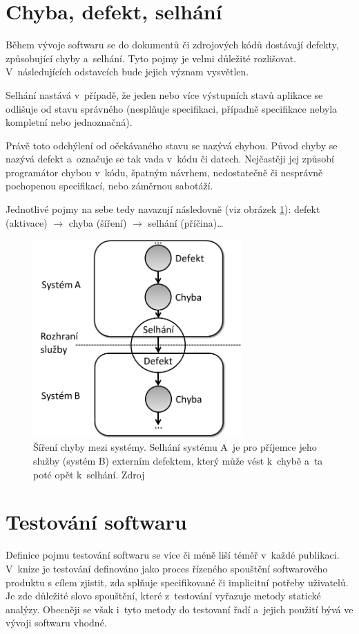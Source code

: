 	\section{Chyba, defekt, selhání}
	Během vývoje softwaru se do dokumentů či zdrojových kódů dostávají defekty, způsobující chyby a~selhání. Tyto pojmy je velmi důležité rozlišovat. V~následujících odstavcích bude jejich význam vysvětlen.
	
	Selhání nastává v~případě, že jeden nebo více výstupních stavů aplikace se odlišuje od stavu správného (nesplňuje specifikaci, případně specifikace nebyla kompletní nebo jednoznačná).
	
	Právě toto odchýlení od očekávaného stavu se nazývá chybou. Původ chyby se nazývá defekt a~označuje se tak vada v~kódu či datech. Nejčastěji jej způsobí programátor chybou v~kódu, špatným návrhem, nedostatečně či nesprávně pochopenou specifikací, nebo záměrnou sabotáží.
	
	Jednotlivé pojmy na sebe tedy navazují následovně (viz obrázek \ref{Bug}): defekt (aktivace) $\to$ chyba (šíření) $\to$ selhání (příčina)\dots
	\begin{figure}[ht!]
		\centering
		\caption{Šíření chyby mezi systémy. Selhání systému A~je pro příjemce jeho služby (systém B) externím defektem, který může vést k~chybě a~ta poté opět  k~selhání. Zdroj \citep{RizeniKvalitySW}}
		\label{Bug}
		\includegraphics[width=8cm]{img/Bug.png}
	\end{figure}
	
	\section{Testování softwaru}
	Definice pojmu testování softwaru se více či méně liší téměř v~každé publikaci. V~knize \citep{RizeniKvalitySW} je testování definováno jako proces řízeného spouštění softwarového produktu s cílem zjistit, zda splňuje specifikované či implicitní potřeby uživatelů. Je zde důležité slovo spouštění, které z~testování vyřazuje metody statické analýzy. Obecněji se však i~tyto metody do testovaní řadí a~jejich použití bývá ve vývoji softwaru vhodné.
	
